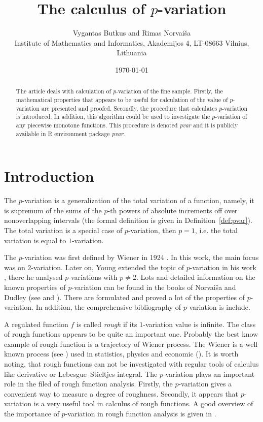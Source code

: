 \documentclass[12pt, a4paper]{article}
\title{The calculus of $p$-variation }
\author{Vygantas Butkus and Rimas Norvaiša \\
\small{Institute of Mathematics and Informatics, Akademijos 4, LT-08663 Vilnius, Lithuania}}
\date{\today}
\numberwithin{equation}{section}
\begin{document}
\maketitle

\begin{abstract}

The article deals with calculation of $p$-variation of 
the fine sample. Firstly, the mathematical properties that
appears to be useful for calculation of the value of 
$p$-variation are presented and proofed. 
Secondly,
the procedure that calculates $p$-variation is introduced.
In addition, this algorithm could be used to investigate
the $p$-variation of any piecewise monotone functions.
This procedure is denoted \emph{pvar} and it is publicly
available in R environment package \emph{pvar}.

\end{abstract}


\section{Introduction}

The $p$-variation is a generalization of the total variation of a function,
namely, it is supremum of the sums of the $p$-th
powers of absolute increments off over nonoverlapping intervals 
(the formal definition is given in Definition~\ref{def:pvar}).
The total variation is a special case of $p$-variation, then 
$p=1$, i.e. the total variation is equal to $1$-variation.

The $p$-variation was first defined by Wiener in 1924 \cite{Wiener1924}.
In this work, the main focus was on $2$-variation. 
Later on, Young extended
the topic of $p$-variation in his work \cite{Young1936}, there 
he analysed $p$-variations with $p \neq 2$. 
Lots and detailed information on the known properties 
of $p$-variation can be found in the books of  Norvaiša and
Dudley (see \cite{DudleyNorvaisa1998} and \cite{DudleyNorvaisa1999}). 
There are formulated and proved a lot of the properties of $p$-variation.
In addition, the comprehensive bibliography of $p$-variation is include.

A regulated function $f$ is called \emph{rough}
if its $1$-variation value is infinite.
The class of rough functions appears to be quite an important one.
Probably the best know example of rough function is 
a trajectory of Wiener process. 
The Wiener is a well known process (see \cite{Karatsas1997}) 
used in statistics, physics and economic (\cite{Econ1997}).
It is worth noting, that rough functions 
can not be investigated 
with regular tools of calculus like
derivative or Lebesgue–Stieltjes integral.
The $p$-variation plays an important role in the filed of
rough function analysis. 
Firstly, the $p$-variation gives a convenient way to measure 
a degree of roughness. 
Secondly, it appears that $p$-variation is a very useful tool 
in calculus of rough functions.
A good overview of the importance of $p$-variation in rough function
analysis is given in \cite{Norvaisa2005}.
 
\end{document}
